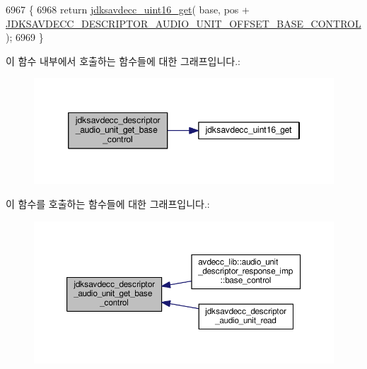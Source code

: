\begin{DoxyCode}
6967 \{
6968     \textcolor{keywordflow}{return} \hyperlink{group__endian_ga3fbbbc20be954aa61e039872965b0dc9}{jdksavdecc\_uint16\_get}( base, pos + 
      \hyperlink{group__descriptor__audio_gac21d759dec278f25f57861706c3a7973}{JDKSAVDECC\_DESCRIPTOR\_AUDIO\_UNIT\_OFFSET\_BASE\_CONTROL} );
6969 \}
\end{DoxyCode}


이 함수 내부에서 호출하는 함수들에 대한 그래프입니다.\+:
\nopagebreak
\begin{figure}[H]
\begin{center}
\leavevmode
\includegraphics[width=346pt]{group__descriptor__audio_ga440b65f044454a6b9e4fb0a4144c58b2_cgraph}
\end{center}
\end{figure}




이 함수를 호출하는 함수들에 대한 그래프입니다.\+:
\nopagebreak
\begin{figure}[H]
\begin{center}
\leavevmode
\includegraphics[width=350pt]{group__descriptor__audio_ga440b65f044454a6b9e4fb0a4144c58b2_icgraph}
\end{center}
\end{figure}


